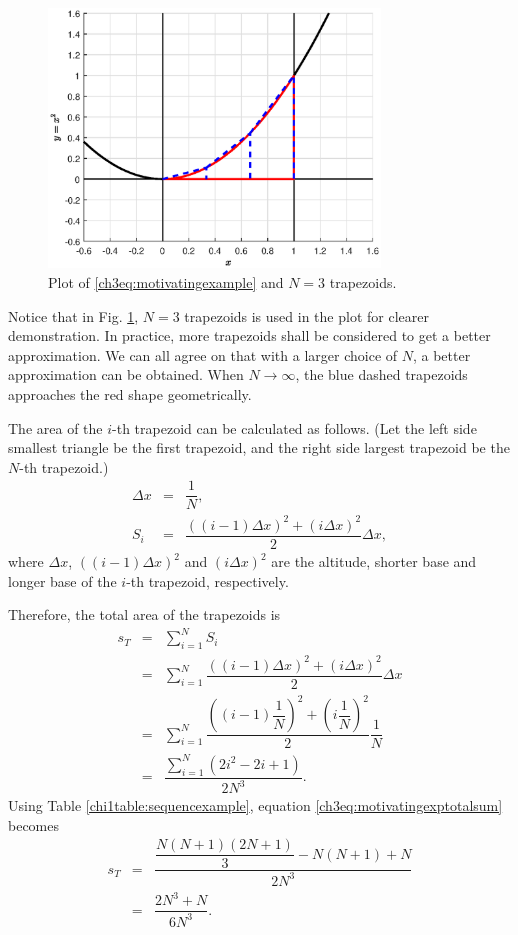 \begin{figure}
\centering
\includegraphics[width=250pt]{chapters/part-1/figures/motivatingexp.eps}
\caption{Plot of \eqref{ch3eq:motivatingexample} and $N=3$ trapezoids.} \label{ch3fig:motivatingexp}
\end{figure}

Notice that in Fig. \ref{ch3fig:motivatingexp}, $N=3$ trapezoids is used in the plot for clearer demonstration. In practice, more trapezoids shall be considered to get a better approximation. We can all agree on that with a larger choice of $N$, a better approximation can be obtained. When $N \rightarrow \infty$, the blue dashed trapezoids approaches the red shape geometrically.

The area of the $i$-th trapezoid can be calculated as follows. (Let the left side smallest triangle be the first trapezoid, and the right side largest trapezoid be the $N$-th trapezoid.)
\begin{eqnarray}
    \Delta x &=& \dfrac{1}{N}, \nonumber \\
    S_i &=& \dfrac{\left((i-1) \Delta x\right)^2 + \left(i \Delta x\right)^2}{2} \Delta x, \nonumber
\end{eqnarray}
where $\Delta x$, $\left((i-1) \Delta x\right)^2$ and $\left(i \Delta x\right)^2$ are the altitude, shorter base and longer base of the $i$-th trapezoid, respectively.

Therefore, the total area of the trapezoids is
\begin{eqnarray}
   s_{T} &=& \sum_{i=1}^{N}S_i \nonumber \\
    &=& \sum_{i=1}^{N} \dfrac{\left((i-1) \Delta x\right)^2 + \left(i \Delta x\right)^2}{2} \Delta x \nonumber \\
    &=& \sum_{i=1}^{N} \dfrac{\left((i-1) \dfrac{1}{N} \right)^2 + \left(i \dfrac{1}{N} \right)^2}{2} \dfrac{1}{N} \nonumber \\
    &=& \dfrac{\sum_{i=1}^{N}\left(2i^2 - 2i + 1\right)}{2N^3}. \label{ch3eq:motivatingexptotalsum}
\end{eqnarray}
Using Table \ref{chi1table:sequencexample}, equation \eqref{ch3eq:motivatingexptotalsum} becomes
\begin{eqnarray}
   s_{T} &=& \dfrac{\dfrac{N(N+1)(2N+1)}{3} - N(N+1) + N}{2N^3} \nonumber \\
    &=& \dfrac{2N^3 + N}{6N^3}. \label{ch3eq:motivatingexptotalsum2}
\end{eqnarray}

